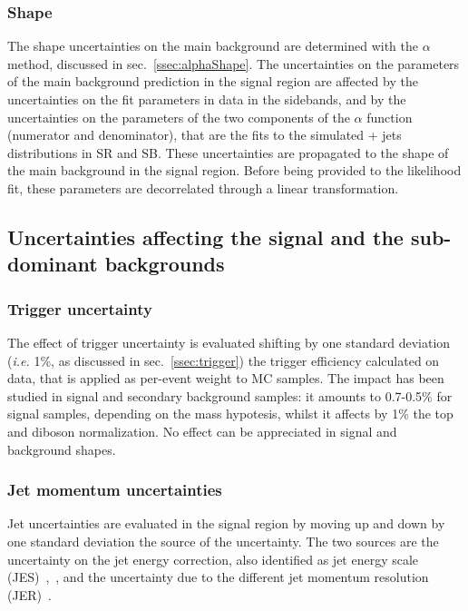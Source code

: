 \subsubsection{Shape}

The shape uncertainties on the main background are determined with the $\alpha$ method, discussed in sec.~\ref{ssec:alphaShape}. The uncertainties on the parameters of the main background prediction in the signal region are affected by the uncertainties on the fit parameters in data in the sidebands, and by the uncertainties on the parameters of the two components of the $\alpha$ function (numerator and denominator), that are the \mtVZ fits to the simulated \V + jets distributions in SR and SB. These uncertainties are propagated to the shape of the main background in the signal region. Before being provided to the likelihood fit, these parameters are decorrelated through a linear transformation.

\subsection{Uncertainties affecting the signal and the sub-dominant backgrounds}

\subsubsection{Trigger uncertainty}

The effect of trigger uncertainty is evaluated shifting by one standard deviation (\textit{i.e.} 1\%, as discussed in sec.~\ref{ssec:trigger}) the \MET trigger efficiency calculated on data, that is applied as per-event weight to MC samples. The impact has been studied in signal and secondary background samples: it amounts to 0.7-0.5\% for signal samples, depending on the mass hypotesis, whilst it affects by 1\% the top and diboson normalization. No effect can be appreciated in signal and background shapes.

\subsubsection{Jet momentum uncertainties}

Jet uncertainties are evaluated in the signal region by moving up and down by one standard deviation the source of the uncertainty. The two sources are the uncertainty on the jet energy correction, also identified as jet energy scale (JES)~\cite{bib:1748-0221-6-11-P11002},~\cite{CMS-DP-2016-020}, and the uncertainty due to the different jet momentum resolution (JER)~\cite{CMS-DP-2016-020}.

